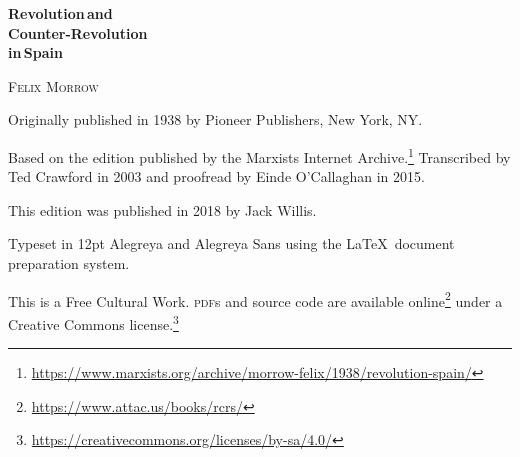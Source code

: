 \begin{titlepage}
	\setlength{\parindent}{0pt}
	
	\vspace*{\fill}
	
	{\sffamily\bfseries\fontsize{40}{40}\selectfont
		Revolution\,\textmd{and} \\
		Counter-Revolution \\
		\textmd{in}\,Spain
		\par}
	
	\vspace{60pt}
	
	{\fontsize{20}{20}\selectfont
		\textsc{Felix Morrow}
		\par}
	
	\vspace*{\fill}
	
\end{titlepage}

{
	\thispagestyle{empty}
	\setlength{\parindent}{0em}
	\setlength{\parskip}{0.5em}
	\sloppy
	
	\vspace*{\fill}
	\vspace*{\fill}
	
	Originally published in 1938 by Pioneer Publishers, New York, NY.
	
	Based on the edition published by the Marxists Internet Archive.\footnote{\href{https://www.marxists.org/archive/morrow-felix/1938/revolution-spain/}{https://www.marxists.org/archive/morrow-felix/1938/revolution-spain/}}
	Transcribed by Ted Crawford in 2003 and proofread by Einde O’Cal\-la\-ghan in 2015.
	
	This edition was published in 2018 by Jack Willis.
	
	Typeset in 12pt Alegreya and {\AlegreyaSans Alegreya Sans} using the \LaTeX\ document preparation system.
	
	This is a Free Cultural Work. \textsc{pdf}s and source code are available online\footnote{\href{https://www.attac.us/books/rcrs/}{https://www.attac.us/books/rcrs/}}
	under a Creative Commons license.\footnote{\href{https://creativecommons.org/licenses/by-sa/4.0/}{https://creativecommons.org/licenses/by-sa/4.0/}}
	
	\vspace*{\fill}
}